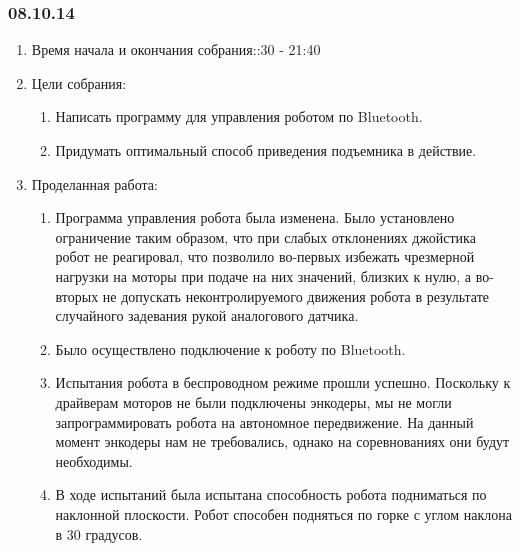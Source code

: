 
\subsubsection{08.10.14}

\begin{enumerate}
	\item Время начала и окончания собрания::30 - 21:40
	\item Цели собрания:\newline
	\begin{enumerate}
	  \item Написать программу для управления роботом по Bluetooth.\newline
	  
	  \item Придумать оптимальный способ приведения подъемника в действие.\newline
	  
    \end{enumerate}
	\item Проделанная работа:\newline
	\begin{enumerate}
	  \item Программа управления робота была изменена. Было установлено ограничение таким образом, что при слабых отклонениях джойстика робот не реагировал, что позволило во-первых избежать чрезмерной нагрузки на моторы при подаче на них значений, близких к нулю, а во-вторых не допускать неконтролируемого движения робота в результате случайного задевания рукой аналогового датчика.\newline
      
      \item Было осуществлено подключение к роботу по Bluetooth.\newline
      
      \item	Испытания робота в беспроводном режиме прошли успешно. Поскольку к драйверам моторов не были подключены энкодеры, мы не могли запрограммировать робота на автономное передвижение. На данный момент энкодеры нам не требовались, однако на соревнованиях они будут необходимы.\newline
      
      \item В ходе испытаний была испытана способность робота подниматься по наклонной плоскости. Робот  способен подняться по горке с углом наклона в 30 градусов.\newline
       

\end{enumerate}
\end{enumerate}
